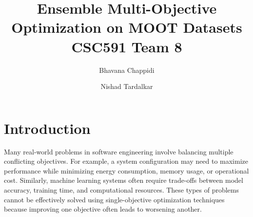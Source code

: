 \documentclass[sigconf,authorversion,nonacm]{acmart}
\begin{document}
\title{Ensemble Multi-Objective Optimization on MOOT Datasets \vspace{0.5em} \\ \large CSC591 Team 8 \vspace{1.5em}}


\author{Bhavana Chappidi}
\affiliation{
  \institution{}
  \city{}
  \country{}
 }

\author{Nishad Tardalkar}
\affiliation{
  \institution{}
  \city{}
  \country{}
}



\renewcommand{\shortauthors}{P08 CSC 591 SWEAI Project}


\maketitle


\renewcommand\footnotetextcopyrightpermission[1]{}



\section{Introduction}

Many real-world problems in software engineering involve balancing multiple 
conflicting objectives. For example, a system configuration may need to 
maximize performance while minimizing energy consumption, memory usage, 
or operational cost. Similarly, machine learning systems often require 
trade-offs between model accuracy, training time, and computational 
resources. These types of problems cannot be effectively solved using 
single-objective optimization techniques because improving one objective 
often leads to worsening another.
\end{document}
